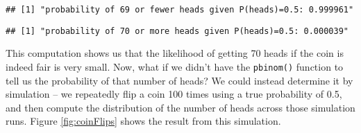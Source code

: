 \documentclass[]{book}
\newenvironment{Shaded}{\begin{snugshade}}{\end{snugshade}}
\newcommand{\KeywordTok}[1]{\textcolor[rgb]{0.13,0.29,0.53}{\textbf{#1}}}
\newcommand{\DecValTok}[1]{\textcolor[rgb]{0.00,0.00,0.81}{#1}}
\newcommand{\FloatTok}[1]{\textcolor[rgb]{0.00,0.00,0.81}{#1}}
\newcommand{\StringTok}[1]{\textcolor[rgb]{0.31,0.60,0.02}{#1}}
\newcommand{\CommentTok}[1]{\textcolor[rgb]{0.56,0.35,0.01}{\textit{#1}}}
\newcommand{\ControlFlowTok}[1]{\textcolor[rgb]{0.13,0.29,0.53}{\textbf{#1}}}
\newcommand{\OperatorTok}[1]{\textcolor[rgb]{0.81,0.36,0.00}{\textbf{#1}}}
\newcommand{\NormalTok}[1]{#1}
\theoremstyle{definition}
\theoremstyle{definition}
\theoremstyle{definition}
\theoremstyle{remark}
\begin{document}
\begin{verbatim}
## [1] "probability of 69 or fewer heads given P(heads)=0.5: 0.999961"
\end{verbatim}

\begin{Shaded}
\end{Shaded}

\begin{verbatim}
## [1] "probability of 70 or more heads given P(heads)=0.5: 0.000039"
\end{verbatim}

This computation shows us that the likelihood of getting 70 heads if the
coin is indeed fair is very small. Now, what if we didn't have the
\texttt{pbinom()} function to tell us the probability of that number of
heads? We could instead determine it by simulation -- we repeatedly flip
a coin 100 times using a true probability of 0.5, and then compute the
distribution of the number of heads across those simulation runs. Figure
\ref{fig:coinFlips} shows the result from this simulation.

\begin{Shaded}
\end{Shaded}
\end{document}
